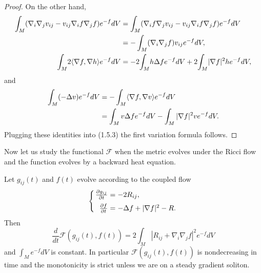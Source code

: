 \begin{proof}
On the other hand,
\begin{align*}
\int_M(\nabla_i\nabla_jv_{ij}-v_{ij}\nabla_if\nabla_jf)e^{-f}dV &=
\int_M(\nabla_if\nabla_jv_{ij}
-v_{ij}\nabla_if\nabla_jf)e^{-f}dV\\
&  = -\int_M(\nabla_i\nabla_jf)v_{ij}e^{-f}dV,\\
\int_M\!2\langle\nabla f,\nabla h\rangle e^{-f}dV &  = -2\!\int_M\!h\Delta
fe^{-f}dV+2\!\int_M\!|\nabla f|^2he^{-f}dV,
\end{align*}
and
\begin{align*}
\int_M(-\Delta v)e^{-f}dV
& = -\int_M\langle\nabla f,\nabla v\rangle e^{-f}dV\\
& = \int_Mv\Delta fe^{-f}dV-\int_M|\nabla f|^2ve^{-f}dV.
\end{align*}
Plugging these identities into (1.5.3) the first variation formula
follows.
\end{proof}

Now let us study the functional ${\mathcal{F}}$ when the metric
evolves under the Ricci flow and the function evolves by a
backward heat equation.

\begin{proposition}
  \label{prop:cz-monotonicity-of-perelmans-f-functional}
Let $g_{ij}(t)$ and $f(t)$ evolve according to the coupled flow
$$\arraycolsep=1.5pt\left\{\begin{array}{rcl}
\frac{\partial g_{ij}}{\partial t}&  =&  -2R_{ij},\\[2mm]
\frac{\partial f}{\partial t}&  =&  -\Delta f+|\nabla f|^2-R.
\end{array}\right.
$$
Then
$$
\frac{d}{dt}{\mathcal{F}}(g_{ij}(t),f(t))
=2\int_M|R_{ij}+\nabla_i\nabla_j f|^2e^{-f}dV
$$
and $\int_Me^{-f}dV$ is constant. In particular
${\mathcal{F}}(g_{ij}(t),f(t))$ is nondecreasing in time and the
monotonicity is strict unless we are on a steady gradient soliton.
\end{proposition}

